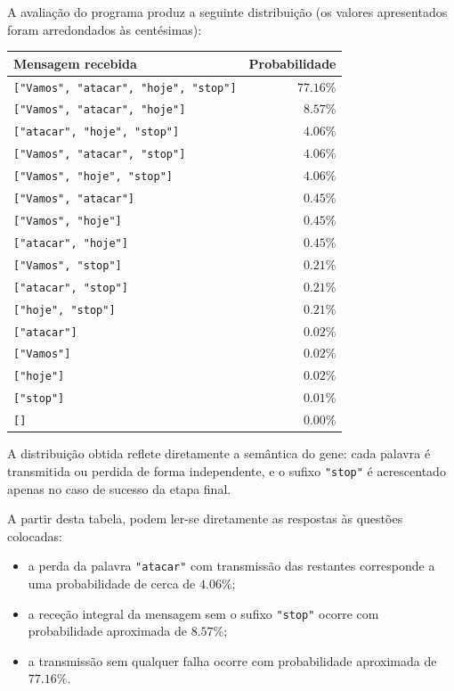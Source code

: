 \documentclass[11pt, a4paper, fleqn]{article}
\begin{document}
\noindent A avaliação do programa produz a seguinte distribuição (os valores apresentados foram arredondados às centésimas):

\begin{center}
\begin{tabular}{l|r}
Mensagem recebida & Probabilidade \\ \hline\hline
\texttt{["Vamos", "atacar", "hoje", "stop"]} & $77.16\%$ \\
\texttt{["Vamos", "atacar", "hoje"]} & $8.57\%$ \\
\texttt{["atacar", "hoje", "stop"]} & $4.06\%$ \\
\texttt{["Vamos", "atacar", "stop"]} & $4.06\%$ \\
\texttt{["Vamos", "hoje", "stop"]} & $4.06\%$ \\
\texttt{["Vamos", "atacar"]} & $0.45\%$ \\
\texttt{["Vamos", "hoje"]} & $0.45\%$ \\
\texttt{["atacar", "hoje"]} & $0.45\%$ \\
\texttt{["Vamos", "stop"]} & $0.21\%$ \\
\texttt{["atacar", "stop"]} & $0.21\%$ \\
\texttt{["hoje", "stop"]} & $0.21\%$ \\
\texttt{["atacar"]} & $0.02\%$ \\
\texttt{["Vamos"]} & $0.02\%$ \\
\texttt{["hoje"]} & $0.02\%$ \\
\texttt{["stop"]} & $0.01\%$ \\
\texttt{[]} & $0.00\%$ \\
\end{tabular}
\end{center}

\noindent A distribuição obtida reflete diretamente a semântica do gene: cada palavra é transmitida ou perdida de forma independente, e o sufixo \texttt{"stop"} é acrescentado apenas no caso de sucesso da etapa final.

\noindent A partir desta tabela, podem ler-se diretamente as respostas às questões colocadas:
\begin{itemize}
    \item a perda da palavra \texttt{"atacar"} com transmissão das restantes corresponde a uma probabilidade de cerca de $4.06\%$;
    \item a receção integral da mensagem sem o sufixo \texttt{"stop"} ocorre com probabilidade aproximada de $8.57\%$;
    \item a transmissão sem qualquer falha ocorre com probabilidade aproximada de $77.16\%$.
\end{itemize}
\end{document}
